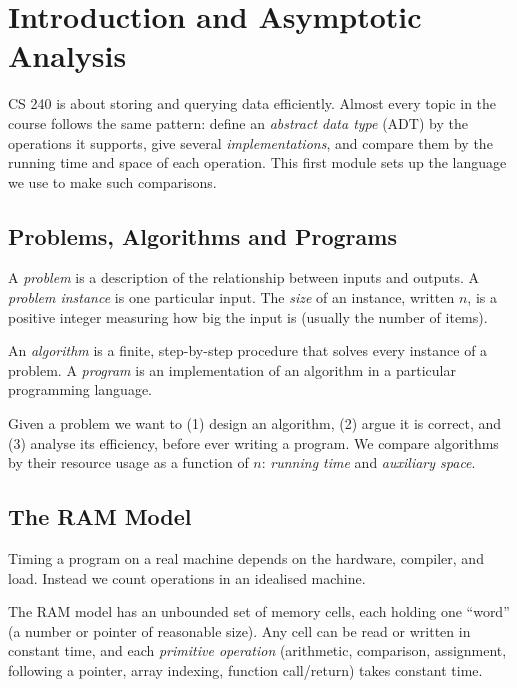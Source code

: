 \chapter{Introduction and Asymptotic Analysis}

CS 240 is about storing and querying data efficiently. Almost every topic in the
course follows the same pattern: define an \emph{abstract data type} (ADT) by the
operations it supports, give several \emph{implementations}, and compare them by
the running time and space of each operation. This first module sets up the
language we use to make such comparisons.

\section{Problems, Algorithms and Programs}

\begin{definition}
A \emph{problem} is a description of the relationship between inputs and outputs.
A \emph{problem instance} is one particular input. The \emph{size} of an instance,
written $n$, is a positive integer measuring how big the input is (usually the
number of items).
\end{definition}

\begin{definition}
An \emph{algorithm} is a finite, step-by-step procedure that solves every instance
of a problem. A \emph{program} is an implementation of an algorithm in a
particular programming language.
\end{definition}

Given a problem we want to (1) design an algorithm, (2) argue it is correct, and
(3) analyse its efficiency, before ever writing a program. We compare algorithms
by their resource usage as a function of $n$: \emph{running time} and
\emph{auxiliary space}.

\section{The RAM Model}

Timing a program on a real machine depends on the hardware, compiler, and load.
Instead we count operations in an idealised machine.

\begin{definition}
The RAM model has an unbounded set of memory cells, each holding one ``word''
(a number or pointer of reasonable size). Any cell can be read or written in
constant time, and each \emph{primitive operation} (arithmetic, comparison,
assignment, following a pointer, array indexing, function call/return) takes
constant time.
\end{definition}

